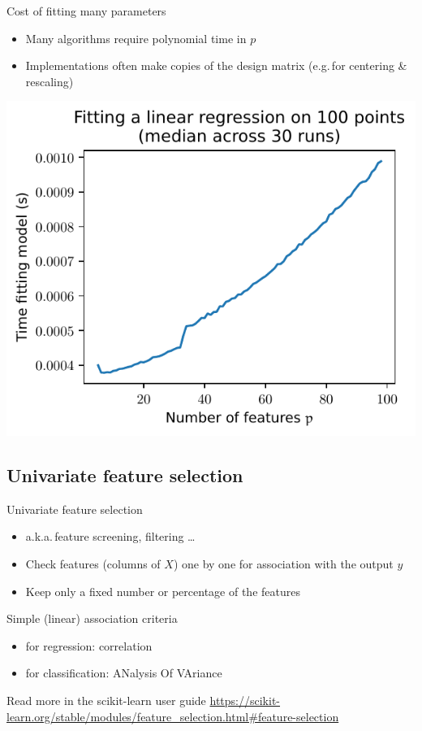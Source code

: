 \documentclass[presentation,mathserif,table]{beamer}
\newcommand{\eg}{e.g.\,}
\newcommand{\aka}{a.k.a.\,}
\begin{document}
\begin{frame}[label={sec:orgb09f81a}]{Cost of fitting many parameters}
\begin{itemize}
\item Many algorithms require polynomial time in \(p\)
\item Implementations often make copies of the design matrix (\eg for centering \& rescaling)
\end{itemize}
\begin{center}
\includegraphics[height=.7\textheight]{figures/generated/ridge_overfitting/durations.pdf}
\end{center}
\end{frame}
\subsection{Univariate feature selection}
\label{sec:org83601c5}
\begin{frame}[label={sec:orgd49d8e6}]{Univariate feature selection}
\begin{itemize}
\item \aka feature screening, filtering \ldots{}
\item Check features (columns of \(X\)) one by one for association with the output \(y\)
\item Keep only a fixed number or percentage of the features
\end{itemize}
\begin{block}{Simple (linear) association criteria}
\begin{itemize}
\item for regression: correlation
\item for classification: ANalysis Of VAriance
\end{itemize}
\end{block}
\begin{block}{Read more in the scikit-learn user guide}
\url{https://scikit-learn.org/stable/modules/feature\_selection.html\#feature-selection}
\end{block}
\end{frame}
\end{document}
